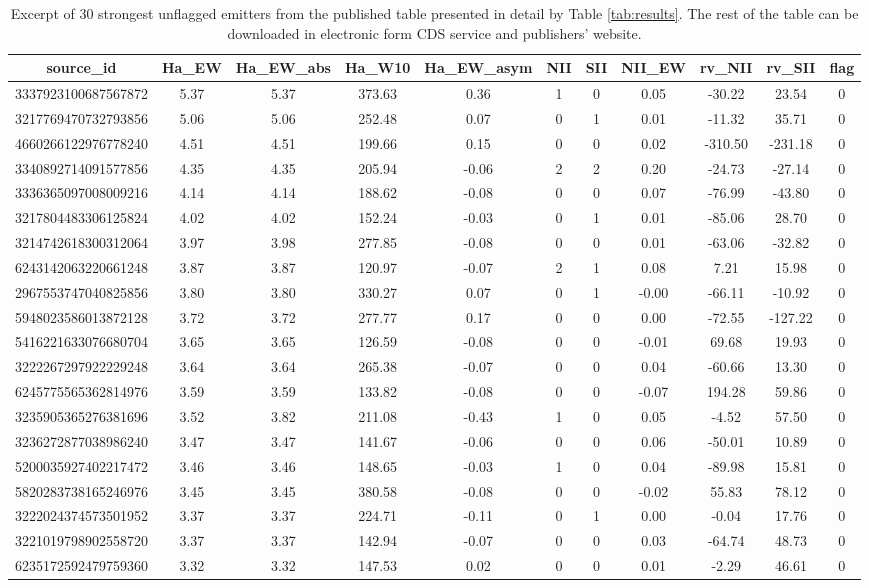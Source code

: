 \begin{table}
	\centering
	\caption{Excerpt of 30 strongest unflagged emitters from the published table presented in detail by Table \ref{tab:results}. The rest of the table can be downloaded in electronic form CDS service and publishers' website.}
	\label{tab:results_values}
	\begin{tabular}{c c c c c c c c c c c}
		\hline
		source\_id & Ha\_EW & Ha\_EW\_abs & Ha\_W10 & Ha\_EW\_asym & NII & SII & NII\_EW & rv\_NII & rv\_SII & flag \\
		\hline \hline
		3337923100687567872 & 5.37 & 5.37 & 373.63 & 0.36 & 1 & 0 & 0.05 & -30.22 & 23.54 & 0 \\
		3217769470732793856 & 5.06 & 5.06 & 252.48 & 0.07 & 0 & 1 & 0.01 & -11.32 & 35.71 & 0 \\
		4660266122976778240 & 4.51 & 4.51 & 199.66 & 0.15 & 0 & 0 & 0.02 & -310.50 & -231.18 & 0 \\
		3340892714091577856 & 4.35 & 4.35 & 205.94 & -0.06 & 2 & 2 & 0.20 & -24.73 & -27.14 & 0 \\
		3336365097008009216 & 4.14 & 4.14 & 188.62 & -0.08 & 0 & 0 & 0.07 & -76.99 & -43.80 & 0 \\
		3217804483306125824 & 4.02 & 4.02 & 152.24 & -0.03 & 0 & 1 & 0.01 & -85.06 & 28.70 & 0 \\
		3214742618300312064 & 3.97 & 3.98 & 277.85 & -0.08 & 0 & 0 & 0.01 & -63.06 & -32.82 & 0 \\
		6243142063220661248 & 3.87 & 3.87 & 120.97 & -0.07 & 2 & 1 & 0.08 & 7.21 & 15.98 & 0 \\
		2967553747040825856 & 3.80 & 3.80 & 330.27 & 0.07 & 0 & 1 & -0.00 & -66.11 & -10.92 & 0 \\
		5948023586013872128 & 3.72 & 3.72 & 277.77 & 0.17 & 0 & 0 & 0.00 & -72.55 & -127.22 & 0 \\
		5416221633076680704 & 3.65 & 3.65 & 126.59 & -0.08 & 0 & 0 & -0.01 & 69.68 & 19.93 & 0 \\
		3222267297922229248 & 3.64 & 3.64 & 265.38 & -0.07 & 0 & 0 & 0.04 & -60.66 & 13.30 & 0 \\
		6245775565362814976 & 3.59 & 3.59 & 133.82 & -0.08 & 0 & 0 & -0.07 & 194.28 & 59.86 & 0 \\
		3235905365276381696 & 3.52 & 3.82 & 211.08 & -0.43 & 1 & 0 & 0.05 & -4.52 & 57.50 & 0 \\
		3236272877038986240 & 3.47 & 3.47 & 141.67 & -0.06 & 0 & 0 & 0.06 & -50.01 & 10.89 & 0 \\
		5200035927402217472 & 3.46 & 3.46 & 148.65 & -0.03 & 1 & 0 & 0.04 & -89.98 & 15.81 & 0 \\
		5820283738165246976 & 3.45 & 3.45 & 380.58 & -0.08 & 0 & 0 & -0.02 & 55.83 & 78.12 & 0 \\
		3222024374573501952 & 3.37 & 3.37 & 224.71 & -0.11 & 0 & 1 & 0.00 & -0.04 & 17.76 & 0 \\
		3221019798902558720 & 3.37 & 3.37 & 142.94 & -0.07 & 0 & 0 & 0.03 & -64.74 & 48.73 & 0 \\
		6235172592479759360 & 3.32 & 3.32 & 147.53 & 0.02 & 0 & 0 & 0.01 & -2.29 & 46.61 & 0 \\
		\hline
	\end{tabular}
\end{table}

